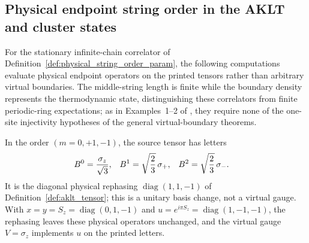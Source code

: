 \subsection{Physical endpoint string order in the AKLT and cluster states}
\label{sec:physical_string_order_examples}

For the stationary infinite-chain correlator of
Definition~\ref{def:physical_string_order_param}, the following computations
evaluate physical endpoint operators on the printed tensors rather than
arbitrary virtual boundaries. The middle-string length is finite while the
boundary density represents the thermodynamic state, distinguishing these
correlators from finite periodic-ring expectations; as in Examples~1--2 of
\cite[local TeX lines~392--411]{PerezGarcia2008StringOrder}, they require
none of the one-site injectivity hypotheses of the general virtual-boundary
theorems.

\begin{definition}
    \label{def:aklt_physical_string_data}
    \leanok
    In the order $(m=0,+1,-1)$, the source tensor has letters
    \begin{align}
        B^0 & =\frac{\sigma_z}{\sqrt3},  &
        B^1 & =\sqrt{\frac23}\,\sigma_+, &
        B^2 & =\sqrt{\frac23}\,\sigma_-.
        \notag
    \end{align}
    It is the diagonal physical rephasing $\operatorname{diag}(1,1,-1)$ of
    Definition~\ref{def:aklt_tensor}; this is a unitary basis change, not a
    virtual gauge. With
    $x=y=S_z=\operatorname{diag}(0,1,-1)$ and
    $u=e^{i\pi S_z}=\operatorname{diag}(1,-1,-1)$,
    the rephasing leaves these physical operators unchanged, and the virtual
    gauge $V=\sigma_z$ implements $u$ on the printed letters.
\end{definition}

